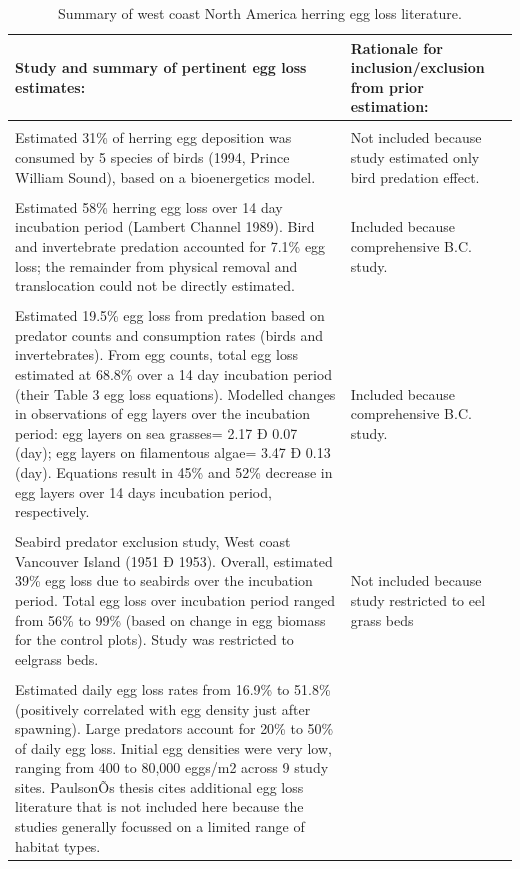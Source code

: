 \begin{table}[htdp]
\caption{Summary of west coast North America herring egg loss literature.}
\begin{center}
\begin{tabular}{|p{}|p{}|}
\hline
\textbf{Study and summary of pertinent egg loss estimates:}&
\textbf{Rationale for inclusion/exclusion from prior estimation:}\\
\hline
\cite{bishop2001predation} &\\ Estimated 31\% of herring egg deposition was consumed by 5 species of birds (1994, Prince William Sound), based on a bioenergetics model. & Not included because study estimated only bird predation effect.\\
\hline
\cite{haegele1991egg} &\\
Estimated 58\% herring egg loss over 14 day incubation period (Lambert Channel 1989).  Bird and invertebrate predation accounted for 7.1\% egg loss; the remainder from physical removal and translocation could not be directly estimated.
&
Included because comprehensive B.C. study. \\
\hline
\cite{Haegele1989egg} & \\
Estimated 19.5\% egg loss from predation based on predator counts and consumption rates (birds and invertebrates).  From egg counts, total egg loss estimated at 68.8\% over a 14 day incubation period (their Table 3 egg loss equations).  Modelled changes in observations of egg layers over the incubation period:  egg layers on sea grasses= 2.17 Ð 0.07 (day); egg layers on filamentous algae= 3.47 Ð 0.13 (day).  Equations result in 45\% and 52\% decrease in egg layers over 14 days incubation period, respectively.
&
Included because comprehensive B.C. study. \\
\hline
\cite{outram1958magnitude}  & \\
Seabird predator exclusion study, West coast Vancouver Island (1951 Ð 1953).  Overall, estimated 39\% egg loss due to seabirds over the incubation period. Total egg loss over incubation period ranged from 56\% to 99\% (based on change in egg biomass for the control plots). Study was restricted to eelgrass beds.
&
Not included because study restricted to eel grass beds\\
\hline
\cite{palsson1984egg}  & \\
Estimated daily egg loss rates from 16.9\% to 51.8\% (positively correlated with egg density just after spawning).  Large predators account for 20\% to 50\% of daily egg loss.  Initial egg densities were very low, ranging from 400 to 80,000 eggs/m2 across 9 study sites.  PaulsonÕs thesis cites additional egg loss literature that is not included here because the studies generally focussed on a limited range of habitat types.

\end{tabular}
\end{center}
\end{table}
